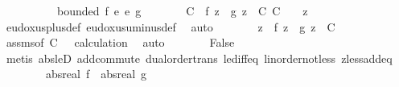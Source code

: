 \begin{isabellebody}
%
\isadelimproof
%
\endisadelimproof
%
\isatagproof
{}\isamarkupfalse%
\ {\isacharminus}{\kern0pt}\isanewline
\ \ \isacommand{{\isacharbraceleft}{\kern0pt}}\isamarkupfalse%
\isanewline
\ \ \ \ \isamarkupfalse%
\ {\isachardoublequoteopen}bounded\ {\isacharparenleft}{\kern0pt}f\ {\isacharplus}{\kern0pt}\isactrlsub e\ {\isacharminus}{\kern0pt}\isactrlsub e\ g{\isacharparenright}{\kern0pt}{\isachardoublequoteclose}\isanewline
\ \ \ \ \isamarkupfalse%
\ \isamarkupfalse%
\ C\ \ {\isachardoublequoteopen}{\isasymbar}f\ z\ {\isacharminus}{\kern0pt}\ g\ z{\isasymbar}\ {\isasymle}\ C{\isachardoublequoteclose}\ {\isachardoublequoteopen}C\ {\isasymge}\ {}{\isachardoublequoteclose}\ \ z\ \isamarkupfalse%
\ eudoxus{\isacharunderscore}{\kern0pt}plus{\isacharunderscore}{\kern0pt}def\ eudoxus{\isacharunderscore}{\kern0pt}uminus{\isacharunderscore}{\kern0pt}def\ \isamarkupfalse%
\ auto\isanewline
\ \ \ \ \isamarkupfalse%
\ \isamarkupfalse%
\ z\ \ {\isachardoublequoteopen}f\ z\ {\isasymge}\ g\ z\ {\isacharplus}{\kern0pt}\ {\isacharparenleft}{\kern0pt}C\ {\isacharplus}{\kern0pt}\ {}{\isacharparenright}{\kern0pt}{\isachardoublequoteclose}\ \isamarkupfalse%
\ assms{\isacharparenleft}{\kern0pt}{}{\isacharparenright}{\kern0pt}{\isacharbrackleft}{\kern0pt}of\ {\isachardoublequoteopen}C\ {\isacharplus}{\kern0pt}\ {}{\isachardoublequoteclose}{\isacharbrackright}{\kern0pt}\ calculation\ \isamarkupfalse%
\ auto\isanewline
\ \ \ \ \isamarkupfalse%
\ \isamarkupfalse%
\ False\ \isamarkupfalse%
\ {\isacharparenleft}{\kern0pt}metis\ abs{\isacharunderscore}{\kern0pt}le{\isacharunderscore}{\kern0pt}D{}\ add{\isachardot}{\kern0pt}commute\ dual{\isacharunderscore}{\kern0pt}order{\isachardot}{\kern0pt}trans\ le{\isacharunderscore}{\kern0pt}diff{\isacharunderscore}{\kern0pt}eq\ linorder{\isacharunderscore}{\kern0pt}not{\isacharunderscore}{\kern0pt}less\ zless{\isacharunderscore}{\kern0pt}add{}{\isacharunderscore}{\kern0pt}eq{\isacharparenright}{\kern0pt}\isanewline
\ \ \isacommand{{\isacharbraceright}{\kern0pt}}\isamarkupfalse%
\isanewline
\ \ \isamarkupfalse%
\ \isamarkupfalse%
\ {\isachardoublequoteopen}abs{\isacharunderscore}{\kern0pt}real\ f\ {\isasymge}\ abs{\isacharunderscore}{\kern0pt}real\ g{\isachardoublequoteclose}\ \isamarkupfalse%

\end{isabellebody}
